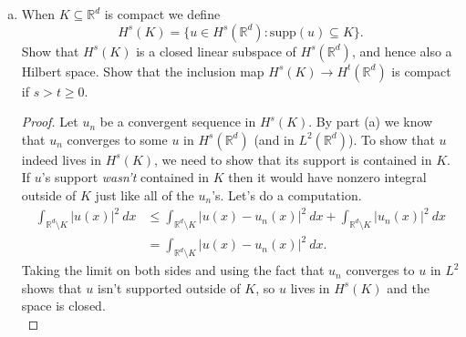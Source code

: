 \documentclass[11pt,letterpaper]{report}
\newcommand{\reals}{\mathbb{R}}
\newcommand{\mcal}[1]{\mathcal{#1}}
\newcommand{\supp}{\text{supp}}
\begin{document}
\begin{enumerate}[(a)]
\begin{proof}
		\noindent We claim that $u_n$ converges to $\mcal{F}^{-1}(v(\xi)\cdot \langle \xi\rangle^{-s})$ in $H^s(\reals^d)$. It was designed for this purpose after all.
		\begin{align*}
			\|u_n - \mcal{F}^{-1}(v(\xi)\cdot \langle \xi\rangle^{-s})\|_{H^s}^2 &= \frac{1}{(2\pi)^d}\int |\widehat{u_n}(\xi) - v(\xi)\cdot \langle \xi\rangle^{-s}|^2\cdot \langle \xi\rangle^{2s}\ d\xi\\
			&= \frac{1}{(2\pi)^d}\int|\widehat{u_n}(\xi)\cdot \langle \xi\rangle^s - v(\xi)|^2\ d\xi\\
			&\to 0.
		\end{align*}
		That $\mcal{F}^{-1}(v(\xi)\cdot \langle \xi\rangle^{-s})$ is in $H^s(\reals^d)$ follows immediately from $v$ being in $L^2(\reals^d)$. Thus, $H^s(\reals^d)$ is complete.
	\end{proof}

	\item When $K\subseteq \reals^d$ is compact we define
	\[
	H^s(K) = \{u\in H^s(\reals^d): \supp(u)\subseteq K\}.
	\]
	Show that $H^s(K)$ is a closed linear subspace of $H^s(\reals^d)$, and hence also a Hilbert space. Show that the inclusion map $H^s(K)\to H^t(\reals^d)$ is compact if $s>t\geq 0$.
	\begin{proof}
		Let $u_n$ be a convergent sequence in $H^s(K)$. By part (a) we know that $u_n$ converges to some $u$ in $H^s(\reals^d)$ (and in $L^2(\reals^d)$). To show that $u$ indeed lives in $H^s(K)$, we need to show that its support is contained in $K$. If $u$'s support \textit{wasn't} contained in $K$ then it would have nonzero integral outside of $K$ just like all of the $u_n$'s. Let's do a computation.
		\begin{align*}
			\int_{\reals^d\setminus K}|u(x)|^2\ dx &\leq \int_{\reals^d\setminus K}|u(x)-u_n(x)|^2\ dx + \int_{\reals^d\setminus K}|u_n(x)|^2\ dx\\
			&= \int_{\reals^d\setminus K}|u(x) - u_n(x)|^2\ dx.
		\end{align*}
		Taking the limit on both sides and using the fact that $u_n$ converges to $u$ in $L^2$ shows that $u$ isn't supported outside of $K$, so $u$ lives in $H^s(K)$ and the space is closed.\\


\end{proof}
\end{enumerate}
\end{document}
